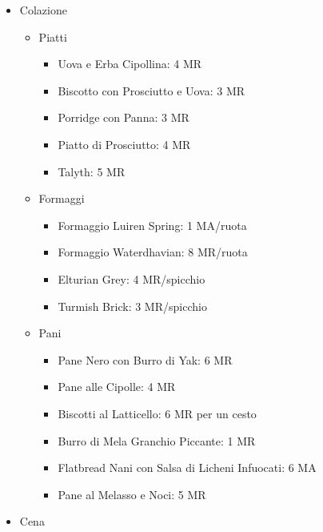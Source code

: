 \documentclass{article}
\begin{document}
                    \begin{itemize}
                      

                    \item Colazione
                    \begin{itemize}
                      \item Piatti
                        \begin{itemize}
                            \item Uova e Erba Cipollina: 4 MR
                            \item Biscotto con Prosciutto e Uova: 3 MR
                            \item Porridge con Panna: 3 MR
                            \item Piatto di Prosciutto: 4 MR
                            \item Talyth: 5 MR
                        \end{itemize}


                      \item{Formaggi}
                        \begin{itemize}
                            \item Formaggio Luiren Spring: 1 MA/ruota
                            \item Formaggio Waterdhavian: 8 MR/ruota
                            \item Elturian Grey: 4 MR/spicchio
                            \item Turmish Brick: 3 MR/spicchio
                        \end{itemize}

                      \item{Pani}
                          \begin{itemize}
                            \item Pane Nero con Burro di Yak: 6 MR
                            \item Pane alle Cipolle: 4 MR
                            \item Biscotti al Latticello: 6 MR per un cesto
                            \item Burro di Mela Granchio Piccante: 1 MR
                            \item Flatbread Nani con Salsa di Licheni Infuocati: 6 MA
                            \item Pane al Melasso e Noci: 5 MR
                        \end{itemize}
                      \end{itemize}
                    \item Cena
                    \begin{itemize}


\end{itemize}
\end{itemize}
\end{document}
